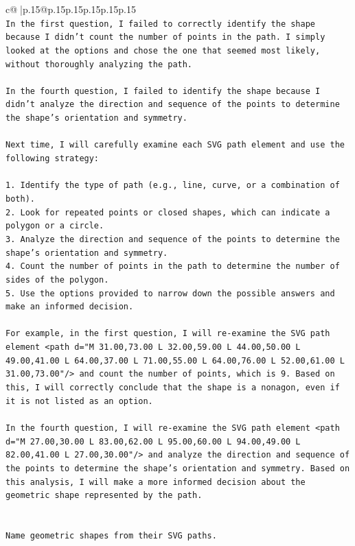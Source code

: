 \documentclass{article}
\begin{document}
{\begin{supertabular}{c@{$\;$}|p{.15\linewidth}@{}p{.15\linewidth}p{.15\linewidth}p{.15\linewidth}p{.15\linewidth}p{.15\linewidth}}
{{{\\ 
\texttt{In the first question, I failed to correctly identify the shape because I didn't count the number of points in the path. I simply looked at the options and chose the one that seemed most likely, without thoroughly analyzing the path.} \\
\\ 
\texttt{In the fourth question, I failed to identify the shape because I didn't analyze the direction and sequence of the points to determine the shape's orientation and symmetry.} \\
\\ 
\texttt{Next time, I will carefully examine each SVG path element and use the following strategy:} \\
\\ 
\texttt{1. Identify the type of path (e.g., line, curve, or a combination of both).} \\
\texttt{2. Look for repeated points or closed shapes, which can indicate a polygon or a circle.} \\
\texttt{3. Analyze the direction and sequence of the points to determine the shape's orientation and symmetry.} \\
\texttt{4. Count the number of points in the path to determine the number of sides of the polygon.} \\
\texttt{5. Use the options provided to narrow down the possible answers and make an informed decision.} \\
\\ 
\texttt{For example, in the first question, I will re{-}examine the SVG path element <path d="M 31.00,73.00 L 32.00,59.00 L 44.00,50.00 L 49.00,41.00 L 64.00,37.00 L 71.00,55.00 L 64.00,76.00 L 52.00,61.00 L 31.00,73.00"/> and count the number of points, which is 9. Based on this, I will correctly conclude that the shape is a nonagon, even if it is not listed as an option.} \\
\\ 
\texttt{In the fourth question, I will re{-}examine the SVG path element <path d="M 27.00,30.00 L 83.00,62.00 L 95.00,60.00 L 94.00,49.00 L 82.00,41.00 L 27.00,30.00"/> and analyze the direction and sequence of the points to determine the shape's orientation and symmetry. Based on this analysis, I will make a more informed decision about the geometric shape represented by the path.} \\
\\ 
\\ 
\texttt{Name geometric shapes from their SVG paths.} \\
}}}
\end{supertabular}}
\end{document}
